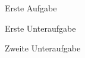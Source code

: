 \documentclass[a4paper]{article}
\begin{document}
\begin{exercise}
    Erste Aufgabe
    \begin{subexercise}
        Erste Unteraufgabe
    \end{subexercise}
    \begin{subexercise}
        Zweite Unteraufgabe
    \end{subexercise}
\end{exercise}
\end{document}
